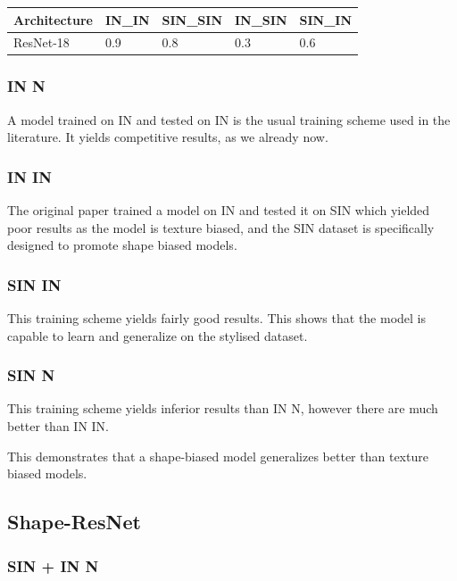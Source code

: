 \documentclass{article}
\begin{document}
\begin{table}[]
  \begin{tabular}{|l|l|l|l|l|}
  \hline
  Architecture & IN\_IN & SIN\_SIN & IN\_SIN & SIN\_IN \\ \hline
  ResNet-18    & 0.9    & 0.8      & 0.3     & 0.6     \\ \hline
  \end{tabular}
  \end{table}

\subsubsection{IN \texorpdfstring{\textrightarrow} IN}
A model trained on IN and tested on IN is the usual training scheme used in the literature.
It yields competitive results, as we already now.


\subsubsection{IN \texorpdfstring{\textrightarrow}  SIN}
The original paper trained a model on IN and tested it on SIN which yielded poor results as 
the model is texture biased, and the SIN dataset is specifically designed to promote shape biased models.

\subsubsection{SIN \texorpdfstring{\textrightarrow}  SIN}
This training scheme yields fairly good results. This shows that the model is capable to learn
and generalize on the stylised dataset.

\subsubsection{SIN \texorpdfstring{\textrightarrow}  IN}

This training scheme yields inferior results than IN \texorpdfstring{\textrightarrow}  IN, however
there are much better than IN \texorpdfstring{\textrightarrow}  SIN. 

This demonstrates that a shape-biased model generalizes better than texture biased models.

\subsection{Shape-ResNet}

\subsubsection{SIN + IN \texorpdfstring{\textrightarrow}  IN}
\end{document}
